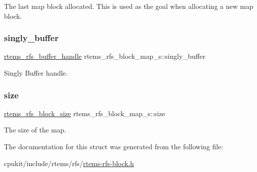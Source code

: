 The last map block allocated. This is used as the goal when allocating a new map block. \mbox{\label{structrtems__rfs__block__map__s_a406b38e6ceda414438ea3cea917a20b6}} 
\subsubsection{\texorpdfstring{singly\_buffer}{singly\_buffer}}
{\footnotesize\ttfamily \mbox{\hyperlink{rtems-rfs-buffer_8h_a17f97c37c5273ad28d413dfd2d175e23}{rtems\+\_\+rfs\+\_\+buffer\+\_\+handle}} rtems\+\_\+rfs\+\_\+block\+\_\+map\+\_\+s\+::singly\+\_\+buffer}

Singly Buffer handle. \mbox{\label{structrtems__rfs__block__map__s_a6c5f3d804cf4bdf7dee7a6a93e85175b}} 
\subsubsection{\texorpdfstring{size}{size}}
{\footnotesize\ttfamily \mbox{\hyperlink{rtems-rfs-block-pos_8h_aa72438eee22908110dc633ca6b89b390}{rtems\+\_\+rfs\+\_\+block\+\_\+size}} rtems\+\_\+rfs\+\_\+block\+\_\+map\+\_\+s\+::size}

The size of the map. 

The documentation for this struct was generated from the following file\+:\begin{DoxyCompactItemize}
\item 
cpukit/include/rtems/rfs/\mbox{\hyperlink{rtems-rfs-block_8h}{rtems-\/rfs-\/block.\+h}}\end{DoxyCompactItemize}
